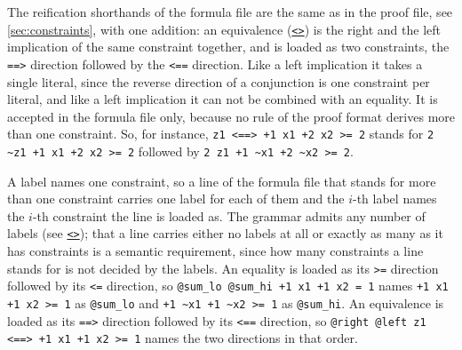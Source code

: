 \documentclass[a4paper]{article}
\newcommand{\lnkBNF}[1]{\hyperlink{def:#1}{<\detokenize{#1}>}}
\begin{document}
The reification shorthands of the formula file are the same as in the proof file, see \autoref{sec:constraints}, with one addition: an equivalence (\texttt{\lnkBNF{xpb_equivalence}}) is the right and the left implication of the same constraint together, and is loaded as two constraints, the \verb!==>! direction followed by the \verb!<==! direction. Like a left implication it takes a single literal, since the reverse direction of a conjunction is one constraint per literal, and like a left implication it can not be combined with an equality. It is accepted in the formula file only, because no rule of the proof format derives more than one constraint. So, for instance, \lstinline[language=veripb]!z1 <==> +1 x1 +2 x2 >= 2! stands for \lstinline[language=veripb]!2 ~z1 +1 x1 +2 x2 >= 2! followed by \lstinline[language=veripb]!2 z1 +1 ~x1 +2 ~x2 >= 2!.

A label names one constraint, so a line of the formula file that stands for more than one constraint carries one label for each of them and the $i$-th label names the $i$-th constraint the line is loaded as. The grammar admits any number of labels (see \texttt{\lnkBNF{xpb_labels}}); that a line carries either no labels at all or exactly as many as it has constraints is a semantic requirement, since how many constraints a line stands for is not decided by the labels. An equality is loaded as its \verb!>=! direction followed by its \verb!<=! direction, so \lstinline[language=veripb]!@sum_lo @sum_hi +1 x1 +1 x2 = 1! names \lstinline[language=veripb]!+1 x1 +1 x2 >= 1! as \verb!@sum_lo! and \lstinline[language=veripb]!+1 ~x1 +1 ~x2 >= 1! as \verb!@sum_hi!. An equivalence is loaded as its \verb!==>! direction followed by its \verb!<==! direction, so \lstinline[language=veripb]!@right @left z1 <==> +1 x1 +1 x2 >= 1! names the two directions in that order.
\end{document}
